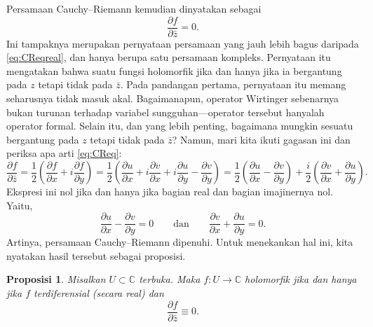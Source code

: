 \documentclass[12pt,openany]{book}
\newcommand{\C}{{\mathbb{C}}}
\theoremstyle{plain}
\newtheorem{prop}[thm]{Proposisi}
\theoremstyle{remark}
\theoremstyle{definition}
\theoremstyle{exercise}
\theoremstyle{example}
\begin{document}
Persamaan Cauchy--Riemann kemudian dinyatakan sebagai
\begin{equation} \label{eq:CReq}
\frac{\partial f}{\partial \bar{z}} = 0 .
\end{equation}
Ini tampaknya merupakan pernyataan persamaan yang jauh lebih bagus daripada \eqref{eq:CReqreal},
dan hanya berupa satu persamaan kompleks.
Pernyataan itu mengatakan bahwa
suatu fungsi holomorfik jika dan hanya jika ia bergantung pada $z$ tetapi tidak pada
$\bar{z}$.  Pada pandangan pertama, pernyataan itu memang seharusnya tidak masuk akal.
Bagaimanapun, operator Wirtinger sebenarnya bukan turunan terhadap
variabel sungguhan---operator tersebut hanyalah operator formal.
Selain itu, dan yang lebih penting,
bagaimana mungkin sesuatu bergantung pada $z$ tetapi tidak pada $\bar{z}$?
Namun, mari kita ikuti gagasan ini dan periksa apa arti \eqref{eq:CReq}:
\begin{equation*}
\frac{\partial f}{\partial \bar{z}} 
=
\frac{1}{2}
\left(
\frac{\partial f}{\partial x} + i
\frac{\partial f}{\partial y}
\right)
=
\frac{1}{2}
\left(
\frac{\partial u}{\partial x} 
+ i \frac{\partial v}{\partial x} 
+ i \frac{\partial u}{\partial y}
- \frac{\partial v}{\partial y}
\right) 
=
\frac{1}{2}
\left(
\frac{\partial u}{\partial x} 
- \frac{\partial v}{\partial y}
\right)
+
\frac{i}{2}
\left(
\frac{\partial v}{\partial x} 
+ \frac{\partial u}{\partial y}
\right) .
\end{equation*}
Ekspresi ini nol jika dan hanya jika bagian real dan bagian
imajinernya nol.  Yaitu,
\begin{equation*}
\frac{\partial u}{\partial x} 
- \frac{\partial v}{\partial y}
= 0
\qquad
\text{dan}
\qquad
\frac{\partial v}{\partial x} 
+ \frac{\partial u}{\partial y} = 0
.
\end{equation*}
Artinya, persamaan Cauchy--Riemann dipenuhi.  Untuk menekankan hal ini,
kita nyatakan hasil tersebut sebagai proposisi.

\begin{prop}
\label{prop:WirtCR}
Misalkan $U \subset \C$ terbuka.  Maka $f \colon U \to \C$
holomorfik jika dan hanya jika
$f$ terdiferensial (secara real) dan
\begin{equation*}
\frac{\partial f}{\partial \bar{z}} \equiv 0 .
\end{equation*}
\end{prop}
\end{document}

